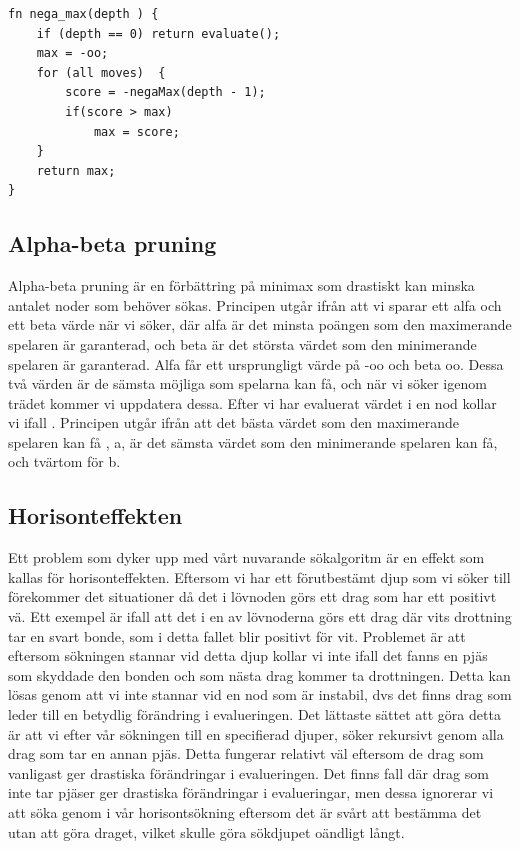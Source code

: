\documentclass{article}
\begin{document}
\begin{verbatim}
fn nega_max(depth ) {
    if (depth == 0) return evaluate();
    max = -oo;
    for (all moves)  {
        score = -negaMax(depth - 1);
        if(score > max)
            max = score;
    }
    return max;
}
\end{verbatim}

\subsection{Alpha-beta pruning}
Alpha-beta pruning är en förbättring på minimax som drastiskt kan minska antalet noder som behöver sökas. Principen utgår ifrån att vi sparar ett alfa och ett beta värde när vi söker, där alfa är det minsta poängen som den maximerande spelaren är garanterad, och beta är det största värdet som den minimerande spelaren är garanterad. Alfa får ett ursprungligt värde på -oo och beta oo. Dessa två värden är de sämsta möjliga som spelarna kan få, och när vi söker igenom trädet kommer vi uppdatera dessa. Efter vi har evaluerat värdet i en nod kollar vi ifall . Principen utgår ifrån att det bästa värdet som den maximerande spelaren kan få , a, är det sämsta värdet som den minimerande spelaren kan få, och tvärtom för b.

\subsection{Horisonteffekten}

Ett problem som dyker upp med vårt nuvarande sökalgoritm är en effekt som kallas för horisonteffekten. Eftersom vi har ett förutbestämt djup som vi söker till förekommer det situationer då det i lövnoden görs ett drag som har ett positivt vä. Ett exempel är ifall att det i en av lövnoderna görs ett drag där vits drottning tar en svart bonde, som i detta fallet blir positivt för vit. Problemet är att eftersom sökningen stannar vid detta djup kollar vi inte ifall det fanns en pjäs som skyddade den bonden och som nästa drag kommer ta drottningen. Detta kan lösas genom att vi inte stannar vid en nod som är instabil, dvs det finns drag som leder till en betydlig förändring i evalueringen. Det lättaste sättet att göra detta är att vi efter vår sökningen till en specifierad djuper, söker rekursivt genom alla drag som tar en annan pjäs. Detta fungerar relativt väl eftersom de drag som vanligast ger drastiska förändringar i evalueringen. Det finns fall där drag som inte tar pjäser ger drastiska förändringar i evalueringar, men dessa ignorerar vi att söka genom i vår horisontsökning eftersom det är svårt att bestämma det utan att göra draget, vilket skulle göra sökdjupet oändligt långt.
\end{document}
